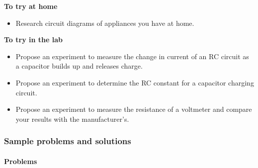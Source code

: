 \begin{framed}
\textbf{To try at home}\\
\begin{itemize}
\item Research circuit diagrams of appliances you have at home.
\end{itemize}
\end{framed}

\begin{framed}
\textbf{To try in the lab}\\
\begin{itemize}
\item Propose an experiment to measure the change in current of an RC circuit as a capacitor builds up and releases charge.
\item Propose an experiment to determine the RC constant for a capacitor charging circuit.
\item Propose an experiment to measure the resistance of a voltmeter and compare your results with the manufacturer's.
\end{itemize}
\end{framed}

\subsubsection{Sample problems and solutions}

\paragraph{Problems}

